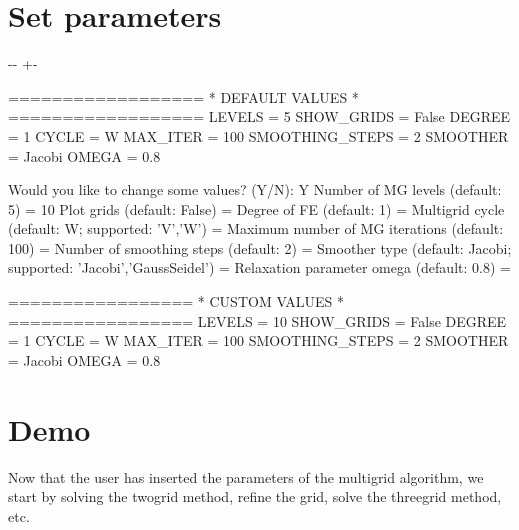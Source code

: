 \documentclass[letterpaper,10pt,english, openany]{sphinxmanual}
\newlength\nbsphinxcodecellspacing
\begin{document}
\section{Set parameters}
\label{\detokenize{Multigrid:Set-parameters}}
{
\begin{sphinxVerbatim}[commandchars=\\\{\}]
\llap{\color{nbsphinxin}[2]:\,\hspace{\fboxrule}\hspace{\fboxsep}}
\end{sphinxVerbatim}
}

{

\kern-\sphinxverbatimsmallskipamount\kern-\baselineskip
\kern+\FrameHeightAdjust\kern-\fboxrule
\vspace{\nbsphinxcodecellspacing}

\begin{sphinxVerbatim}[commandchars=\\\{\}]
==================
* DEFAULT VALUES *
==================
LEVELS              = 5
SHOW\_GRIDS          = False
DEGREE              = 1
CYCLE               = W
MAX\_ITER            = 100
SMOOTHING\_STEPS     = 2
SMOOTHER            = Jacobi
OMEGA               = 0.8

Would you like to change some values? (Y/N): Y
Number of MG levels (default: 5) = 10
Plot grids (default: False) =
Degree of FE (default: 1) =
Multigrid cycle (default: W; supported: 'V','W') =
Maximum number of MG iterations (default: 100) =
Number of smoothing steps (default: 2) =
Smoother type (default: Jacobi; supported: 'Jacobi','GaussSeidel') =
Relaxation parameter omega (default: 0.8) =

=================
* CUSTOM VALUES *
=================
LEVELS              = 10
SHOW\_GRIDS          = False
DEGREE              = 1
CYCLE               = W
MAX\_ITER            = 100
SMOOTHING\_STEPS     = 2
SMOOTHER            = Jacobi
OMEGA               = 0.8

\end{sphinxVerbatim}
}


\section{Demo}
\label{\detokenize{Multigrid:Demo}}
Now that the user has inserted the parameters of the multigrid algorithm, we start by solving the two\sphinxhyphen{}grid method, refine the grid, solve the three\sphinxhyphen{}grid method, etc.
\end{document}
